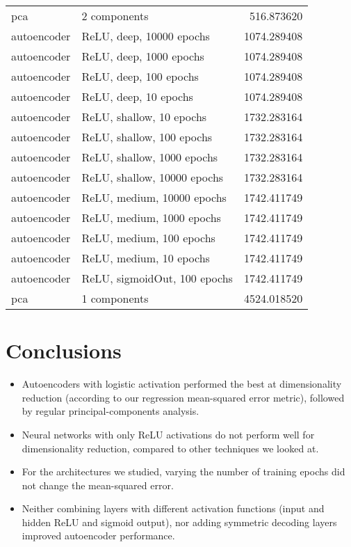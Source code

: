 \documentclass{article}
\begin{document}
\begin{table}
\begin{tabular}{llr}
        pca &                    2 components &   516.873620 \\
autoencoder &        ReLU, deep, 10000 epochs &  1074.289408 \\
autoencoder &         ReLU, deep, 1000 epochs &  1074.289408 \\
autoencoder &          ReLU, deep, 100 epochs &  1074.289408 \\
autoencoder &           ReLU, deep, 10 epochs &  1074.289408 \\
autoencoder &        ReLU, shallow, 10 epochs &  1732.283164 \\
autoencoder &       ReLU, shallow, 100 epochs &  1732.283164 \\
autoencoder &      ReLU, shallow, 1000 epochs &  1732.283164 \\
autoencoder &     ReLU, shallow, 10000 epochs &  1732.283164 \\
autoencoder &      ReLU, medium, 10000 epochs &  1742.411749 \\
autoencoder &       ReLU, medium, 1000 epochs &  1742.411749 \\
autoencoder &        ReLU, medium, 100 epochs &  1742.411749 \\
autoencoder &         ReLU, medium, 10 epochs &  1742.411749 \\
autoencoder &    ReLU, sigmoidOut, 100 epochs &  1742.411749 \\
        pca &                    1 components &  4524.018520 \\
\bottomrule
\end{tabular}
\end{table}

\section{Conclusions}
\begin{itemize}
\item Autoencoders with logistic activation performed the best at dimensionality reduction (according to our regression mean-squared error metric), followed by regular principal-components analysis.
\item Neural networks with only ReLU activations do not perform well for dimensionality reduction, compared to other techniques we looked at.
\item For the architectures we studied, varying the number of training epochs did not change the mean-squared error. 
\item Neither combining layers with different activation functions (input and hidden ReLU and sigmoid output), nor adding symmetric decoding layers improved autoencoder performance.
\end{itemize}
\end{document}
